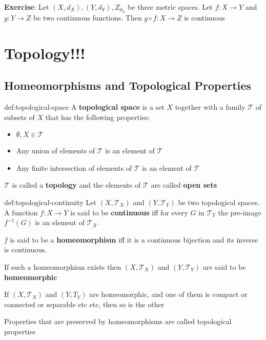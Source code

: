 \documentclass{article}
\begin{document}
\textbf{Exercise}: Let $(X, d_{X}), (Y, d_{Y}), Z_{d_{Z}}$ be three metric spaces. Let $f : X \to Y$ and $g : Y\to Z$ be two continuous functions. Then $g\circ f : X \to Z$ is continuous

\newpage
\section{Topology!!!}
\subsection{Homeomorphisms and Topological Properties}
\begin{dfn}{def:topological-space}{}
    A \textbf{topological space} is a set $X$ together with a family $\mathcal{T}$ of subsets of $X$ that has the following properties:
    \begin{itemize}
        \item $\emptyset,X\in \mathcal{T}$
        \item Any union of elements of $\mathcal{T}$ is an element of $\mathcal{T}$
        \item Any finite intersection of elements of $\mathcal{T}$ is an element of $\mathcal{T}$
    \end{itemize}
    $\mathcal{T}$ is called a \textbf{topology} and the elements of $\mathcal{T}$ are called \textbf{open sets}
\end{dfn}

\begin{dfn}{def:topological-continuity}{}
    Let $(X, \mathcal{T}_{X})$ and $(Y, \mathcal{T}_{Y})$ be two topological spaces. A function $f : X \to Y$ is said to be \textbf{continuous} iff for every $G$ in $\mathcal{T}_{Y}$ the pre-image $f^{-1}(G)$ is an element of $\mathcal{T}_{X}$.

    $f$ is said to be a \textbf{homeomorphism} iff it is a continuous bijection and its inverse is continuous.

    If such a homeomorphism exists then $(X, \mathcal{T}_{X})$ and $(Y, \mathcal{T}_{Y})$ are said to be \textbf{homeomorphic}
\end{dfn}

If $(X, \mathcal{T}_{X})$ and $(Y, T_{Y})$ are homeomorphic, and one of them is compact or connected or separable etc etc, then so is the other

Properties that are preserved by homeomorphisms are called topological properties
\end{document}

